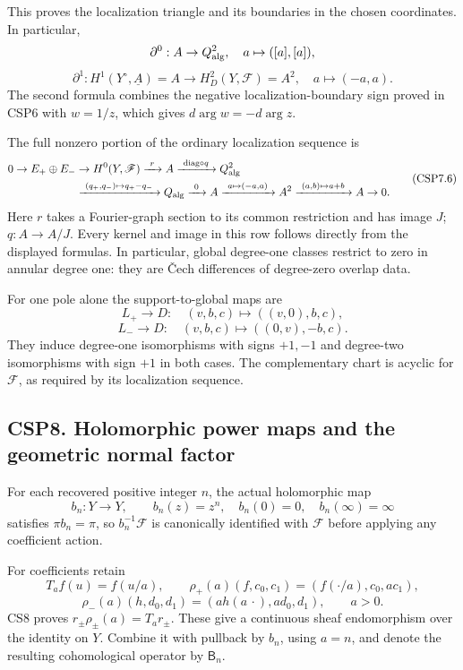 This proves the localization triangle and its boundaries in the chosen
coordinates. In particular, \[
\partial^0:A\to Q_{\rm alg}^2,\quad a\mapsto([a],[a]),
\] \[
\partial^1:H^1(Y^\circ,\underline A)=A
\to H^2_D(Y,\mathscr F)=A^2,\quad a\mapsto(-a,a).
\tag{CSP7.5}
\] The second formula combines the negative localization-boundary sign
proved in CSP6 with \(w=1/z\), which gives \(d\arg w=-d\arg z\).

The full nonzero portion of the ordinary localization sequence is \[
\begin{aligned}
0\to E_+\oplus E_-&\to H^0(Y,\mathscr F)
 \xrightarrow{\ r\ }A
 \xrightarrow{\ \mathrm{diag}\circ q\ }Q_{\rm alg}^2\\
&\xrightarrow{\ (q_+,q_-)\mapsto q_+-q_-\ }Q_{\rm alg}
 \xrightarrow{\ 0\ }A
 \xrightarrow{\ a\mapsto(-a,a)\ }A^2
 \xrightarrow{\ (a,b)\mapsto a+b\ }A\to0.
\end{aligned}
\tag{CSP7.6}
\] Here \(r\) takes a Fourier-graph section to its common restriction
and has image \(J\); \(q:A\to A/J\). Every kernel and image in this row
follows directly from the displayed formulas. In particular, global
degree-one classes restrict to zero in annular degree one: they are Čech
differences of degree-zero overlap data.

For one pole alone the support-to-global maps are \[
L_+\to D:\quad(v,b,c)\mapsto((v,0),b,c),
\] \[
L_-\to D:\quad(v,b,c)\mapsto((0,v),-b,c).
\tag{CSP7.7}
\] They induce degree-one isomorphisms with signs \(+1,-1\) and
degree-two isomorphisms with sign \(+1\) in both cases. The
complementary chart is acyclic for \(\mathscr F\), as required by its
localization sequence.

\subsection{CSP8. Holomorphic power maps and the geometric normal
factor}\label{csp8.-holomorphic-power-maps-and-the-geometric-normal-factor}

For each recovered positive integer \(n\), the actual holomorphic map \[
b_n:Y\to Y,\qquad b_n(z)=z^n,\quad b_n(0)=0,\quad b_n(\infty)=\infty
\tag{CSP8.1}
\] satisfies \(\pi b_n=\pi\), so \(b_n^{-1}\mathscr F\) is canonically
identified with \(\mathscr F\) before applying any coefficient action.

For coefficients retain \[
T_a f(u)=f(u/a),\qquad
\rho_+(a)(f,c_0,c_1)=(f(\cdot/a),c_0,a c_1),
\] \[
\rho_-(a)(h,d_0,d_1)=(a h(a\,\cdot),a d_0,d_1),\qquad a>0.
\tag{CSP8.2}
\] CS8 proves \(r_\pm\rho_\pm(a)=T_ar_\pm\). These give a continuous
sheaf endomorphism over the identity on \(Y\). Combine it with pullback
by \(b_n\), using \(a=n\), and denote the resulting cohomological
operator by \(\mathsf B_n\).

